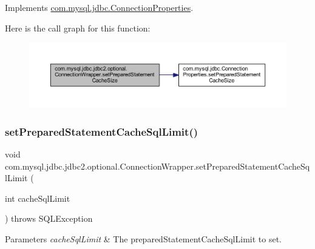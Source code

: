 Implements \mbox{\hyperlink{interfacecom_1_1mysql_1_1jdbc_1_1_connection_properties_ad65dad2e98f66f1b4a8d1aff24cbc2d5}{com.\+mysql.\+jdbc.\+Connection\+Properties}}.

Here is the call graph for this function\+:
\nopagebreak
\begin{figure}[H]
\begin{center}
\leavevmode
\includegraphics[width=350pt]{classcom_1_1mysql_1_1jdbc_1_1jdbc2_1_1optional_1_1_connection_wrapper_a5f678b0f5276621832a23fc1c9a31786_cgraph}
\end{center}
\end{figure}
\mbox{\label{classcom_1_1mysql_1_1jdbc_1_1jdbc2_1_1optional_1_1_connection_wrapper_acdf5cc8f365225e264d7a667a13abcba}} 
\subsubsection{\texorpdfstring{set\+Prepared\+Statement\+Cache\+Sql\+Limit()}{setPreparedStatementCacheSqlLimit()}}
{\footnotesize\ttfamily void com.\+mysql.\+jdbc.\+jdbc2.\+optional.\+Connection\+Wrapper.\+set\+Prepared\+Statement\+Cache\+Sql\+Limit (\begin{DoxyParamCaption}\item[{int}]{cache\+Sql\+Limit }\end{DoxyParamCaption}) throws S\+Q\+L\+Exception}


\begin{DoxyParams}{Parameters}
{\em cache\+Sql\+Limit} & The prepared\+Statement\+Cache\+Sql\+Limit to set. \\
\hline
\end{DoxyParams}

